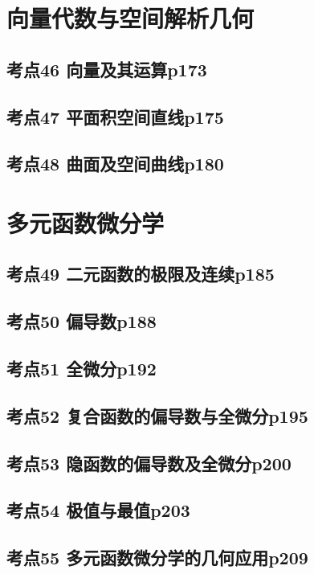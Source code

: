 \chapter{向量代数与空间解析几何}

\section{考点46 向量及其运算p173}

\section{考点47 平面积空间直线p175}

\section{考点48 曲面及空间曲线p180}

\chapter{多元函数微分学}

\section{考点49 二元函数的极限及连续p185}

\section{考点50 偏导数p188}

\section{考点51 全微分p192}

\section{考点52 复合函数的偏导数与全微分p195}

\section{考点53 隐函数的偏导数及全微分p200}

\section{考点54 极值与最值p203}

\section{考点55 多元函数微分学的几何应用p209}

